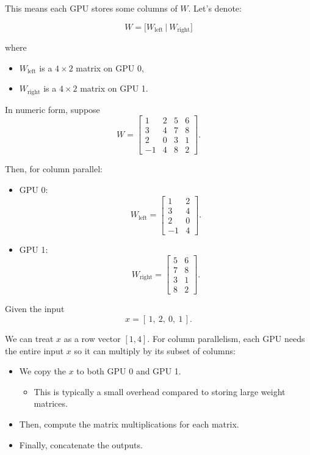 This means each GPU stores some columns of \(W\). Let's denote:

\[
W = \bigl[W_{\text{left}} \,\big|\ W_{\text{right}}\bigr]
\]

where
\begin{itemize}
	\item \( W_{\text{left}} \) is a \(4 \times 2\) matrix on GPU 0,  
	\item \( W_{\text{right}} \) is a \(4 \times 2\) matrix on GPU 1.
\end{itemize}

In numeric form, suppose
\[
W =
\begin{bmatrix}
1 & 2 & 5 & 6\\
3 & 4 & 7 & 8\\
2 & 0 & 3 & 1\\
-1 & 4 & 8 & 2
\end{bmatrix}.
\]

Then, for column parallel:
\begin{itemize}
	\item GPU 0:  
  \[
  W_{\text{left}} = 
  \begin{bmatrix}
  1 & 2 \\
  3 & 4 \\
  2 & 0 \\
  -1 & 4 
  \end{bmatrix}.
  \]
\item GPU 1:  
  \[
  W_{\text{right}} = 
  \begin{bmatrix}
  5 & 6 \\
  7 & 8 \\
  3 & 1 \\
  8 & 2
  \end{bmatrix}.
  \]
\end{itemize}

Given the input
\[
x = [\, 1,\ 2,\ 0,\ 1\,].
\]

We can treat \(x\) as a row vector \([1,4]\). For column parallelism, each GPU needs the entire input \(x\) so it can multiply by its subset of columns:
\begin{itemize}
	\item We copy the \( x \) to both GPU 0 and GPU 1.  
		\begin{itemize}
			\item This is typically a small overhead compared to storing large weight matrices.
		\end{itemize}
	\item Then, compute the matrix multiplications for each matrix.
	\item Finally, concatenate the outputs.
\end{itemize}


